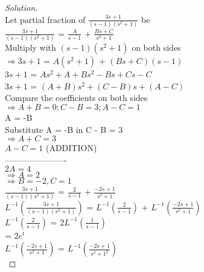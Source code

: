 \documentclass[12pt]{article}
\begin{document}
\begin{proof}[Solution]
\text{}\\
Let partial fraction of $\frac{3s+1}{(s-1)(s^2+1)}$ be \\

$\frac{3s+1}{(s-1)(s^2+1)}$   =   $\frac{A}{s-1}$ + $\frac{Bs+C}{s^2+1}$ \\

Multiply with $(s-1)(s^2+1)$ on both sides \\

$\Rightarrow 3s+1 $  = $A(s^2+1)$ + $(Bs+C)(s-1)$ \\

$3s+1$  =  $As^2 +A +Bs^2 - Bs + Cs - C $ \\

$3s+1$  =  $(A+B) s^2 + (C-B) s +(A-C) $ \\

Compare the coefficients on both sides \\

$\Rightarrow A+B = 0 ; C-B = 3 ; A-C = 1$ \\

A = -B \\

Substitute A = -B in C - B = 3 \\

$\Rightarrow A+C = 3$ \\
     $ A-C = 1$  (ADDITION)\\
     ----------------------\\
     $2A =4$ \\
     
     $\Rightarrow A = 2$ \\
     
     $\Rightarrow B = -2 , C = 1$ \\
     
     $\frac{3s+1}{(s-1)(s^2+1)}$   =   $\frac{2}{s-1}$ + $\frac{-2s+1}{s^2+1}$ \\
     
     $L^{-1}(\frac{3s+1}{(s-1)(s^2+1)})$  = $L^{-1}(\frac{2}{s-1})$  +  $L^{-1}(\frac{-2s+1}{s^2+1})$ \\
     
     $L^{-1}(\frac{2}{s-1})$   =  $ 2 L^{-1}(\frac{1}{s-1})$ \\
                          
                          = $ 2 e^t$ \\
                          
     $L^{-1}(\frac{-2s+1}{s^2+1})$  = $L^{-1}(\frac{-2s+1}{s^2+1^2})$ \\
     

\end{proof}
\end{document}
